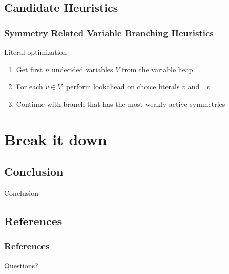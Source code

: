 \documentclass{beamer}
\begin{document}
	\subsection{Candidate Heuristics}
	\begin{frame}
		\frametitle{Symmetry Related Variable Branching Heuristics}

		\begin{block}{Literal optimization}
			\begin{enumerate}
				\item<+-> Get first $n$ undecided variables $V$ from the variable heap
				\item<+-> For each $v \in V$: perform lookahead on choice literals $v$ and $\neg v$
				\item<+-> Continue with branch that has the most weakly-active symmetries
			\end{enumerate}
		\end{block}


	\end{frame}

\section{Break it down}

	\subsection{Conclusion}
	\begin{frame}
	\Huge{\centerline{Conclusion}}
	\end{frame}

	\subsection{References}
	\begin{frame}[allowframebreaks]
		\frametitle{References}
		
		
	\end{frame}

	\begin{frame}
	\Huge{\centerline{Questions?}}
	\end{frame}
\end{document}
